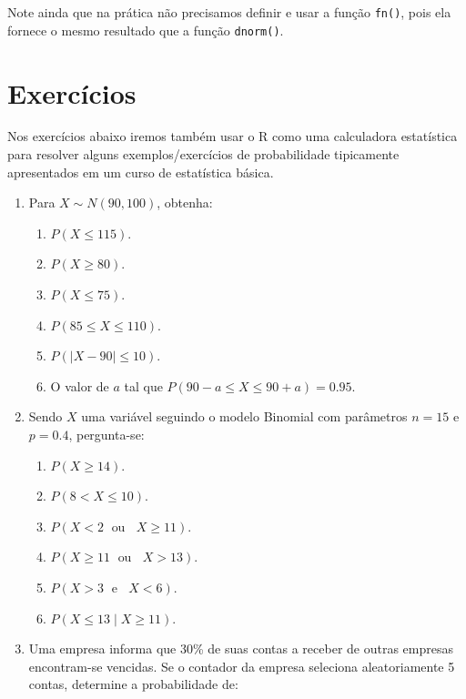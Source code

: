 \documentclass[
  10pt,
  a4paper]{book}
\providecommand{\tightlist}{%
  \setlength{\itemsep}{0pt}\setlength{\parskip}{0pt}}
\begin{document}
Note ainda que na prática não precisamos definir e usar a função \texttt{fn()},
pois ela fornece o mesmo resultado que a função \texttt{dnorm()}.

\hypertarget{exercuxedcios-17}{%
\section*{Exercícios}\label{exercuxedcios-17}}


Nos exercícios abaixo iremos também usar o R como uma calculadora
estatística para resolver alguns exemplos/exercícios de probabilidade
tipicamente apresentados em um curso de estatística básica.

\begin{enumerate}
\def\labelenumi{\arabic{enumi}.}
\tightlist
\item
  Para \(X \sim N(90, 100)\), obtenha:

  \begin{enumerate}
  \def\labelenumii{\alph{enumii}.}
  \tightlist
  \item
    \(P(X \leq 115)\).
  \item
    \(P(X \geq 80)\).
  \item
    \(P(X \leq 75)\).
  \item
    \(P(85 \leq X \leq 110)\).
  \item
    \(P(|X - 90| \leq 10)\).
  \item
    O valor de \(a\) tal que \(P(90-a \leq X \leq 90+a) = 0.95\).
  \end{enumerate}
\item
  Sendo \(X\) uma variável seguindo o modelo
  Binomial com parâmetros \(n = 15\) e \(p = 0.4\), pergunta-se:

  \begin{enumerate}
  \def\labelenumii{\alph{enumii}.}
  \tightlist
  \item
    \(P(X \geq 14)\).
  \item
    \(P(8 < X \leq 10)\).
  \item
    \(P(X < 2 \; \mbox{ ou } \;\; X \geq 11)\).
  \item
    \(P(X \geq 11 \; \mbox{ ou } \;\; X > 13)\).
  \item
    \(P(X > 3 \; \mbox{ e } \;\; X < 6)\).
  \item
    \(P(X \leq 13 \; | \; X \geq 11)\).
  \end{enumerate}
\item
  Uma empresa informa que 30\% de suas contas a receber de outras empresas encontram-se vencidas. Se o contador da empresa seleciona aleatoriamente 5 contas, determine a probabilidade de:


\end{enumerate}
\end{document}
